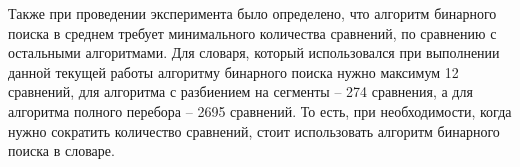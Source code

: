 Также при проведении эксперимента было определено, что алгоритм бинарного поиска в среднем требует минимального количества сравнений, по сравнению с остальными алгоритмами. Для словаря, который использовался при выполнении данной текущей работы алгоритму бинарного поиска нужно максимум 12 сравнений, для алгоритма с разбиением на сегменты -- 274 сравнения, а для алгоритма полного перебора -- 2695 сравнений. То есть, при необходимости, когда нужно сократить количество сравнений, стоит использовать алгоритм бинарного поиска в словаре.
